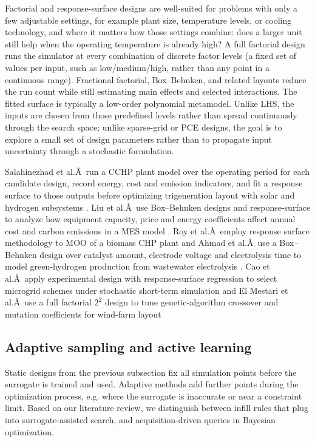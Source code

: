 Factorial and response-surface designs are well-suited for problems with
only a few adjustable settings, for example plant size, temperature
levels, or cooling technology, and where it matters how those settings
combine: does a larger unit still help when the operating temperature is
already high? A full factorial design runs the simulator at every
combination of discrete factor levels (a fixed set of values per input,
such as low/medium/high, rather than any point in a continuous range).
Fractional factorial, Box--Behnken, and related layouts reduce the run
count while still estimating main effects and selected interactions. The
fitted surface is typically a low-order polynomial metamodel. Unlike
LHS, the inputs are chosen from those predefined levels rather than
spread continuously through the search space; unlike sparse-grid or PCE
designs, the goal is to explore a small set of design parameters rather
than to propagate input uncertainty through a stochastic formulation.

Salahinezhad et al.Â~run a CCHP plant model over the operating period for
each candidate design, record energy, cost and emission indicators, and
fit a response surface to those outputs before optimizing trigeneration
layout with solar and hydrogen subsystems \cite{Salahinezhad2025}. Liu et
al.Â~use Box--Behnken designs and response-surface to analyze how
equipment capacity, price and energy coefficients affect annual cost and
carbon emissions in a MES model \cite{Liu2025__4}. Roy et al.Â~employ
response surface methodology to MOO of a biomass CHP plant \cite{Roy2023}
and Ahmad et al.Â~use a Box--Behnken design over catalyst amount,
electrode voltage and electrolysis time to model green-hydrogen
production from wastewater electrolysis \cite{Ahmad202451}. Cao et al.Â~apply
experimental design with response-surface regression to select microgrid
schemes under stochastic short-term simulation \cite{Cao2017} and El Mestari
et al.Â~use a full factorial $2^2$ design to tune genetic-algorithm
crossover and mutation coefficients for wind-farm layout
\cite{El Mestari2025}

\subsection{Adaptive sampling and active learning}
\label{sec:doe:adaptive}

Static designs from the previous subsection fix all simulation points
before the surrogate is trained and used. Adaptive methods add further
points during the optimization process, e.g. where the surrogate is
inaccurate or near a constraint limit. Based on our literature review,
we distinguish between infill rules that plug into surrogate-assisted
search, and acquisition-driven queries in Bayesian optimization.

